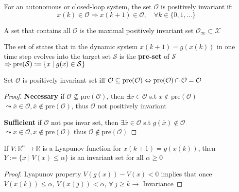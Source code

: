 

\begin{definition}
	For an autonomous or closed-loop system,
	the set $\mathcal{O}$ is positively invariant if:
	\[
		x(k)\in\mathcal{O}\Rightarrow
		x(k+1) \in \mathcal{O},
		\quad \forall k \in \{0,1,\dots\}
	\]
\end{definition}

\begin{definition}
	A set that contains all $\mathcal{O}$
	is the maximal positively invariant set
	$\mathcal{O}_\infty \subset \mathcal{X}$
\end{definition}

\begin{definition}
	The set of states that
	in the dynamic system $x(k+1) = g(x(k))$
	in one time step evolves into the target set $\mathcal{S}$
	is the \textbf{pre-set} of $\mathcal{S}$
	$\Rightarrow \operatorname{pre}(\mathcal{S}) := \{x\mid g(x)\in \mathcal{S}\}$
\end{definition}

\begin{theorem}
	Set $\mathcal{O}$ is positively invariant set iff
	$\mathcal{O}\subseteq\operatorname{pre}(\mathcal{O})
		\Leftrightarrow
		\operatorname{pre}(\mathcal{O})\cap\mathcal{O} = \mathcal{O}$
\end{theorem}
\begin{proof}
	\textbf{Necessary} if
	$\mathcal{O} \nsubseteq  \mathrm{pre}(\mathcal{O})$,
	then $\exists\bar{x} \in \mathcal{O}$
	s.t $\bar{x} \notin \mathrm{pre}(\mathcal{O})$
	$\leadsto \bar{x}\in\mathcal{O},
		\bar{x}\notin\mathrm{pre}(\mathcal{O})$,
	thus $\mathcal{O}$ not positively invariant

	\textbf{Sufficient} if
	$\mathcal{O}$ not pos invar set,
	then $\exists \bar{x}\in\mathcal{O}$
	s.t $g(\bar{x}) \notin\mathcal{O}$
	$\leadsto \bar{x}\in\mathcal{O},
		\bar{x}\notin\mathrm{pre}(\mathcal{O})$
	thus $\mathcal{O}\notin \mathrm{pre}(\mathcal{O})$
\end{proof}

\begin{lemma}{}

	If $V:\mathbb{R}^n \to \mathbb{R}$ is a Lyapunov function
	for $x(k+1) = g(x(k))$, then
	$Y := \{x \mid V(x) \leq \alpha\}$
	is an invariant set for all $\alpha \geq 0$
\end{lemma}
\begin{proof}
	Lyapunov property $V(g(x)) - V(x) < 0$
	implies that once $V(x(k))\leq \alpha$,
	$V(x(j))<\alpha$,
	$\forall\ j\ge k \rightarrow$ Invariance
\end{proof}

